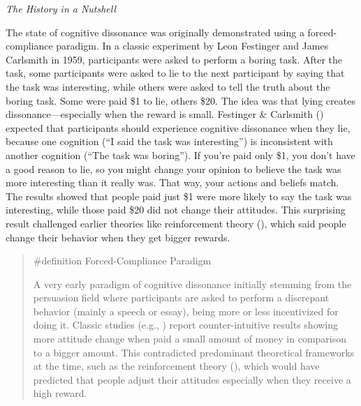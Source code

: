 \documentclass[
  letterpaper,
]{book}
\begin{document}
\emph{The History in a Nutshell}

The state of cognitive dissonance was originally demonstrated using a
forced-compliance paradigm. In a classic experiment by Leon Festinger
and James Carlsmith in 1959, participants were asked to perform a boring
task. After the task, some participants were asked to lie to the next
participant by saying that the task was interesting, while others were
asked to tell the truth about the boring task. Some were paid \$1 to
lie, others \$20. The idea was that lying creates
dissonance---especially when the reward is small. Festinger \& Carlsmith
() expected that participants
should experience cognitive dissonance when they lie, because one
cognition (``I said the task was interesting'') is inconsistent with
another cognition (``The task was boring''). If you're paid only \$1,
you don't have a good reason to lie, so you might change your opinion to
believe the task was more interesting than it really was. That way, your
actions and beliefs match. The results showed that people paid just \$1
were more likely to say the task was interesting, while those paid \$20
did not change their attitudes. This surprising result challenged
earlier theories like reinforcement theory
(), which said
people change their behavior when they get bigger rewards.

\begin{quote}
\label{def-forcedcomplianceparadigm}{\#definition}
Forced-Compliance Paradigm

A very early paradigm of cognitive dissonance initially stemming from
the persuasion field where participants are asked to perform a
discrepant behavior (mainly a speech or essay), being more or less
incentivized for doing it. Classic studies (e.g.,
)
report counter-intuitive results showing more attitude change when paid
a small amount of money in comparison to a bigger amount. This
contradicted predominant theoretical frameworks at the time, such as the
reinforcement theory (), which would have predicted that people adjust their attitudes
especially when they receive a high reward.
\end{quote}
\end{document}
